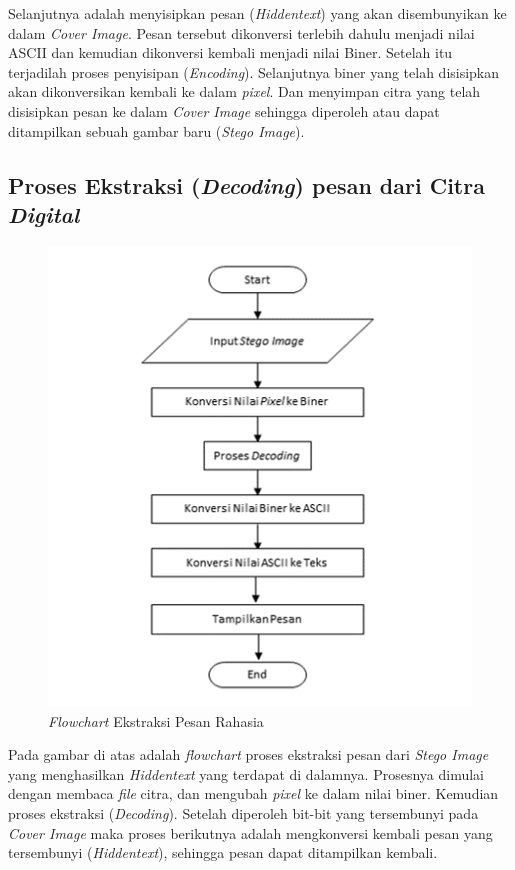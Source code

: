 	Selanjutnya adalah menyisipkan pesan (\emph{Hiddentext}) yang akan disembunyikan ke dalam \emph{Cover Image}. Pesan tersebut dikonversi terlebih dahulu menjadi nilai ASCII dan kemudian dikonversi kembali menjadi nilai Biner. Setelah itu terjadilah proses penyisipan (\emph{Encoding}). Selanjutnya biner yang telah disisipkan akan dikonversikan kembali ke dalam \emph{pixel}. Dan menyimpan citra yang telah disisipkan pesan ke dalam \emph{Cover Image} sehingga diperoleh atau	dapat ditampilkan sebuah gambar baru (\emph{Stego Image}).
	
	\subsection{Proses Ekstraksi (\emph{Decoding}) pesan dari Citra \emph{Digital}}
	
	\begin{figure}[H]
		\centering
		\includegraphics[height=0.6\textheight]{gambar/ekstraksi3}
		\caption{\emph{Flowchart} Ekstraksi Pesan Rahasia}
		\label{flowchart_ekstraksi}
	\end{figure}

	Pada gambar di atas adalah \emph{flowchart} proses ekstraksi pesan dari \emph{Stego Image} yang menghasilkan \emph{Hiddentext} yang terdapat di dalamnya. Prosesnya dimulai dengan
	membaca \emph{file} citra, dan mengubah \emph{pixel} ke dalam nilai biner.
	Kemudian proses ekstraksi (\emph{Decoding}). Setelah diperoleh bit-bit yang tersembunyi pada \emph{Cover Image} maka proses
	berikutnya adalah mengkonversi kembali pesan yang tersembunyi (\emph{Hiddentext}), sehingga pesan dapat ditampilkan kembali.

